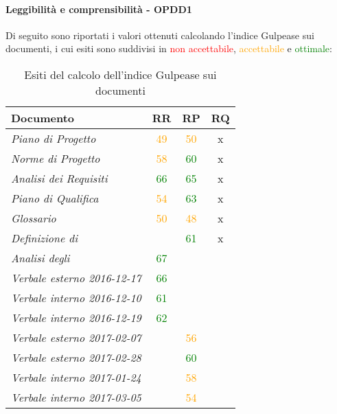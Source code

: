\documentclass[PdQ.tex]{subfiles}
\begin{document}
		\paragraph{Leggibilità e comprensibilità - OPDD1}
				Di seguito sono riportati i valori ottenuti calcolando l'indice Gulpease sui documenti, i cui esiti sono suddivisi in \textcolor{red}{non accettabile}, \textcolor{orange}{accettabile} e \textcolor{green}{ottimale}:
				\begin{table}[h]
				\centering
				\begin{tabular}{l c c c}
					\hline
					\rule[-0.3cm]{0cm}{0.8cm}
					\textbf{Documento} & \textbf{RR} & \textbf{RP} & \textbf{RQ}\\
					\hline
					\rule[0cm]{0cm}{0.4cm}
					\textit{Piano di Progetto} & \textcolor{orange}{49} & \textcolor{orange}{50} & x \\
					\rule[0cm]{0cm}{0.4cm}
					\textit{Norme di Progetto}& \textcolor{orange}{58} & \textcolor{green}{60} & x \\
					\rule[0cm]{0cm}{0.4cm}
					\textit{Analisi dei Requisiti} & \textcolor{green}{66} & \textcolor{green}{65} & x \\
					\rule[0cm]{0cm}{0.4cm}
					\textit{Piano di Qualifica} & \textcolor{orange}{54} & \textcolor{green}{63} & x \\
					\rule[0cm]{0cm}{0.4cm}
					\textit{Glossario} & \textcolor{orange}{50} & \textcolor{orange}{48} & x\\
					\rule[0cm]{0cm}{0.4cm}
					\textit{Definizione di \gl{Prodotto}} & & \textcolor{green}{61} & x \\
					\rule[0cm]{0cm}{0.4cm}
					\textit{Analisi degli \gl{SDK}} & \textcolor{green}{67} & &  \\
					\rule[0cm]{0cm}{0.4cm}
					\textit{Verbale esterno 2016-12-17} & \textcolor{green}{66} & & \\
					\rule[0cm]{0cm}{0.4cm}
					\textit{Verbale interno 2016-12-10} & \textcolor{green}{61} & & \\
					\rule[0cm]{0cm}{0.4cm}
					\textit{Verbale interno 2016-12-19} & \textcolor{green}{62} & & \\
					\rule[0cm]{0cm}{0.4cm}
					\textit{Verbale esterno 2017-02-07} & & \textcolor{orange}{56} & \\
					\rule[0cm]{0cm}{0.4cm}
					\textit{Verbale esterno 2017-02-28} & & \textcolor{green}{60} & \\
					\rule[0cm]{0cm}{0.4cm}
					\textit{Verbale interno 2017-01-24} & & \textcolor{orange}{58} & \\
					\rule[0cm]{0cm}{0.4cm}
					\textit{Verbale interno 2017-03-05} & & \textcolor{orange}{54} & \\
					\hline
				\end{tabular}
				\caption{Esiti del calcolo dell'indice Gulpease sui documenti}
			\end{table}
\end{document}
